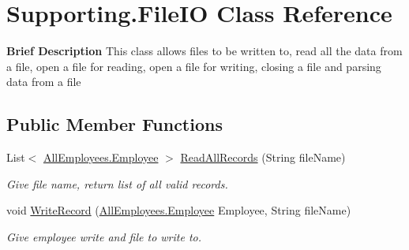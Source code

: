 \hypertarget{class_supporting_1_1_file_i_o}{}\section{Supporting.\+File\+I\+O Class Reference}
\label{class_supporting_1_1_file_i_o}


{\bfseries Brief Description} This class allows files to be written to, read all the data from a file, open a file for reading, open a file for writing, closing a file and parsing data from a file  


\subsection*{Public Member Functions}
\begin{DoxyCompactItemize}
\item 
List$<$ \hyperlink{class_all_employees_1_1_employee}{All\+Employees.\+Employee} $>$ \hyperlink{class_supporting_1_1_file_i_o_ab33154b7acbb27ecaee49cfe701691e7}{Read\+All\+Records} (String file\+Name)
\begin{DoxyCompactList}\small\item\em Give file name, return list of all valid records. \end{DoxyCompactList}\item 
void \hyperlink{class_supporting_1_1_file_i_o_a23293f70ec655e87ea568ffada174b9f}{Write\+Record} (\hyperlink{class_all_employees_1_1_employee}{All\+Employees.\+Employee} Employee, String file\+Name)
\begin{DoxyCompactList}\small\item\em Give employee write and file to write to. \end{DoxyCompactList}\end{DoxyCompactItemize}
